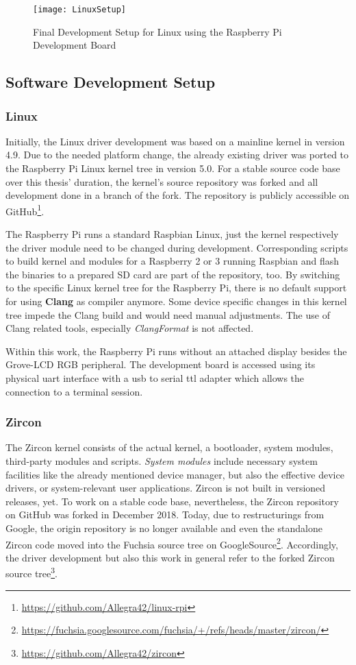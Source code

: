 \begin{figure} [ht]
    \centering
    \texttt{[image: LinuxSetup]}
    \caption{Final Development Setup for Linux using the Raspberry Pi Development Board}\label{pic:linuxsetup}
\end{figure} 


\subsection{Software Development Setup}
\subsubsection*{Linux}
Initially, the Linux driver development was based on a mainline kernel in version 4.9.
Due to the needed platform change, the already existing driver was ported to the Raspberry Pi Linux kernel tree in version 5.0.
For a stable source code base over this thesis' duration, the kernel's source repository was forked and all development done in a branch of the fork.
The repository is publicly accessible on GitHub\footnote{\url{https://github.com/Allegra42/linux-rpi}}.

The Raspberry Pi runs a standard Raspbian Linux, just the kernel respectively the driver module need to be changed during development.
Corresponding scripts to build kernel and modules for a Raspberry 2 or 3 running Raspbian and flash the binaries to a prepared SD card are part of the repository, too.
By switching to the specific Linux kernel tree for the Raspberry Pi, there is no default support for using \textbf{Clang} as compiler anymore.
Some device specific changes in this kernel tree impede the Clang build and would need manual adjustments.
The use of Clang related tools, especially \textit{ClangFormat} is not affected.

Within this work, the Raspberry Pi runs without an attached display besides the Grove-LCD RGB peripheral.
The development board is accessed using its physical \ac{uart} interface with a \ac{usb} to serial \ac{ttl} adapter which allows the connection to a terminal session.


\subsubsection*{Zircon}
The Zircon kernel consists of the actual kernel, a bootloader, system modules, third-party modules and scripts.
\textit{System modules} include necessary system facilities like the already mentioned device manager, but also the effective device drivers, or system-relevant user applications.
Zircon is not built in versioned releases, yet.
To work on a stable code base, nevertheless, the Zircon repository on GitHub was forked in December 2018.
Today, due to restructurings from Google, the origin repository is no longer available and even the standalone Zircon code moved into the Fuchsia source tree on GoogleSource\footnote{\url{https://fuchsia.googlesource.com/fuchsia/+/refs/heads/master/zircon/}}.
Accordingly, the driver development but also this work in general refer to the forked Zircon source tree\footnote{\url{https://github.com/Allegra42/zircon}}.

